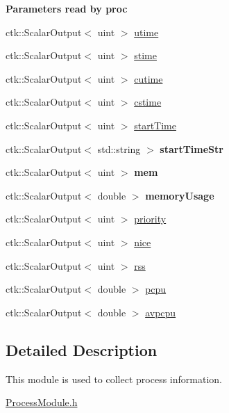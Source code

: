 \begin{Indent}{\bf Parameters read by proc}\par
\begin{DoxyCompactItemize}
\item 
ctk\+::\+Scalar\+Output$<$ uint $>$ \hyperlink{structProcessInfoModule_a80e5447f89a1af566893b4a8ce32c75e}{utime}
\item 
ctk\+::\+Scalar\+Output$<$ uint $>$ \hyperlink{structProcessInfoModule_a568d95f9a110c5db3171d49acfedf9be}{stime}
\item 
ctk\+::\+Scalar\+Output$<$ uint $>$ \hyperlink{structProcessInfoModule_a6e6f822ed218e8e5a461f769ef415188}{cutime}
\item 
ctk\+::\+Scalar\+Output$<$ uint $>$ \hyperlink{structProcessInfoModule_a81577c12862b69dfeaf5986a088a9ce1}{cstime}
\item 
ctk\+::\+Scalar\+Output$<$ uint $>$ \hyperlink{structProcessInfoModule_a63fa6f3d052df587ee88136d260f85aa}{start\+Time}
\item 
ctk\+::\+Scalar\+Output$<$ std\+::string $>$ {\bfseries start\+Time\+Str}
\item 
ctk\+::\+Scalar\+Output$<$ uint $>$ {\bfseries mem}
\item 
ctk\+::\+Scalar\+Output$<$ double $>$ {\bfseries memory\+Usage}
\item 
ctk\+::\+Scalar\+Output$<$ uint $>$ \hyperlink{structProcessInfoModule_a8c1f9421332dba2c78910481c59c7631}{priority}
\item 
ctk\+::\+Scalar\+Output$<$ uint $>$ \hyperlink{structProcessInfoModule_aa2befa8a18c00d4e2465d6b9e55dfe2b}{nice}
\item 
ctk\+::\+Scalar\+Output$<$ uint $>$ \hyperlink{structProcessInfoModule_a3d74cbbee14a01fa4ac85d56180f593f}{rss}
\item 
ctk\+::\+Scalar\+Output$<$ double $>$ \hyperlink{structProcessInfoModule_a0523ecd5aaa8518050f2b23000ab6705}{pcpu}
\item 
ctk\+::\+Scalar\+Output$<$ double $>$ \hyperlink{structProcessInfoModule_a835b59215e858942a3e26cefd122d350}{avpcpu}
\end{DoxyCompactItemize}
\end{Indent}


\subsection{Detailed Description}
This module is used to collect process information. 

\hyperlink{ProcessModule_8h_source}{Process\+Module.\+h}

